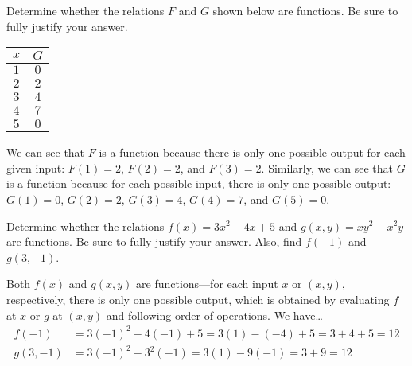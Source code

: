 \documentclass[11pt,letterpaper]{article}
\begin{document}
\newpage



 Determine whether the relations $F$ and $G$ shown below are functions. Be sure to fully justify your answer. \pspace
	\hfill
	\begin{minipage}[c]{0.48\textwidth}
	\end{minipage}%
	\begin{minipage}[c]{0.40\textwidth}
	\begin{table}[H]
	\centering
	\begin{tabular}{cc}
	$x$ & $G$ \\ \hline
	$1$ & $0$ \\
	$2$ & $2$ \\
	$3$ & $4$ \\
	$4$ & $7$ \\
	$5$ & $0$
	\end{tabular}
	\end{table}
	\end{minipage} \pvspace{1.3cm}

\sol We can see that $F$ is a function because there is only one possible output for each given input: $F(1)= 2$, $F(2)= 2$, and $F(3)= 2$. Similarly, we can see that $G$ is a function because for each possible input, there is only one possible output: $G(1)= 0$, $G(2)= 2$, $G(3)= 4$, $G(4)= 7$, and $G(5)= 0$. 



\newpage



 Determine whether the relations $f(x)= 3x^2 - 4x + 5$ and $g(x, y)= xy^2 - x^2y$ are functions. Be sure to fully justify your answer. Also, find $f(-1)$ and $g(3, -1)$. \pspace

\sol Both $f(x)$ and $g(x, y)$ are functions---for each input $x$ or $(x, y)$, respectively, there is only one possible output, which is obtained by evaluating $f$ at $x$ or $g$ at $(x, y)$ and following order of operations. We have\dots	
	\[
	\begin{aligned}
	f(-1)&= 3(-1)^2 - 4(-1) + 5= 3(1) - (-4) + 5= 3 + 4 + 5= 12 \\[0.3cm]
	g(3, -1)&= 3(-1)^2 - 3^2 (-1)= 3(1) - 9(-1)= 3 + 9= 12
	\end{aligned}
	\]
\end{document}
